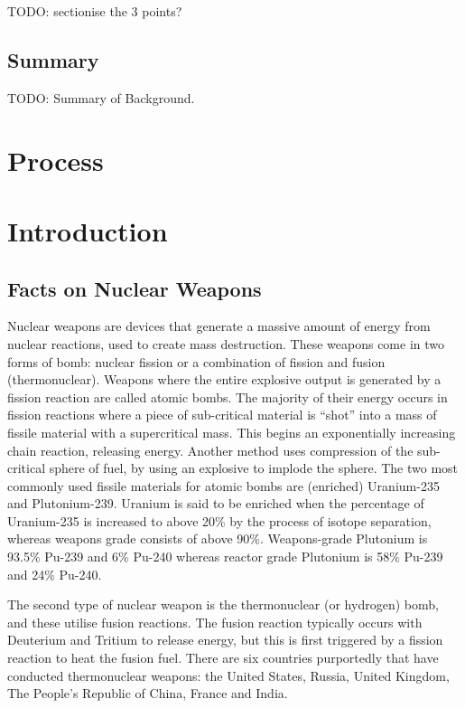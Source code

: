 \documentclass[twoside,titlepage,11pt,twocolumn,a4paper]{article}
\begin{document}
TODO: sectionise the 3 points?
\subsection{Summary}
TODO: Summary of Background.

\section{Process}

\section{Introduction}

\subsection{Facts on Nuclear Weapons}
Nuclear weapons are devices that generate a massive amount of energy
from nuclear reactions, used to create mass destruction. These weapons
come in two forms of bomb: nuclear fission or a combination of fission
and fusion (thermonuclear). Weapons where the entire explosive output
is generated by a fission reaction are called atomic bombs. The
majority of their energy occurs in fission reactions where a piece of
sub-critical material is ``shot'' into a mass of fissile material with
a supercritical mass. This begins an exponentially increasing chain
reaction, releasing energy. Another method uses compression of the
sub-critical sphere of fuel, by using an explosive to implode the
sphere. The two most commonly used fissile materials for atomic bombs
are (enriched) Uranium-235 and Plutonium-239. Uranium is said to be
enriched when the percentage of Uranium-235 is increased to above 20\%
by the process of isotope separation, whereas weapons grade consists
of above 90\%. \citep{blackmarket} Weapons-grade Plutonium is 93.5\%
Pu-239 and 6\% Pu-240 whereas reactor grade Plutonium is 58\% Pu-239
and 24\% Pu-240.  \citep{drell1993}

The second type of nuclear weapon is the thermonuclear (or hydrogen)
bomb, and these utilise fusion reactions.  The fusion reaction
typically occurs with Deuterium and Tritium to release energy, but
this is first triggered by a fission reaction to heat the fusion
fuel. There are six countries purportedly that have conducted
thermonuclear weapons: the United States, Russia, United Kingdom, The
People's Republic of China, France and India.
\end{document}
